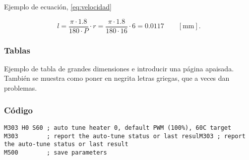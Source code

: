 Ejemplo de ecuación, \autoref{eq:velocidad}

\begin{equation}\label{eq:velocidad}
	l = \frac{\pi\cdot1.8}{180\cdot P}\cdot r = \frac{\pi\cdot1.8}{180\cdot16}\cdot 6 = 0.0117 \qquad [\mathrm{mm}].
\end{equation}




\subsubsection{Tablas}

Ejemplo de tabla de grandes dimensiones e introducir una página apaisada. También se muestra como poner en negrita letras griegas, que a veces dan problemas.

\begin{landscape}
    \vspace*{\fill}
    
    \vspace*{\fill}
    \clearpage
\end{landscape}



\subsubsection{Código}


\begin{lstlisting}
M303 H0 S60 ; auto tune heater 0, default PWM (100%), 60C target
M303        ; report the auto-tune status or last resulM303 ; report the auto-tune status or last result
M500        ; save parameters
\end{lstlisting}

